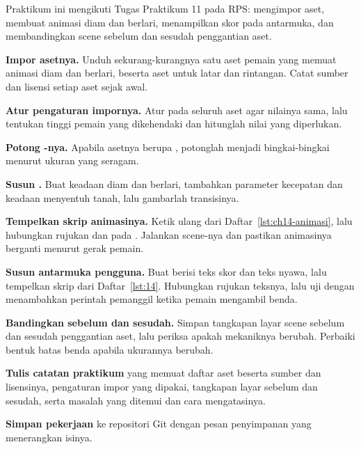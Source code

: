 \begin{praktikumbox}
Praktikum ini mengikuti Tugas Praktikum 11 pada RPS: mengimpor aset, membuat
animasi diam dan berlari, menampilkan skor pada antarmuka, dan membandingkan
scene sebelum dan sesudah penggantian aset.

\begin{langkah}
  \item \textbf{Impor asetnya.} Unduh sekurang-kurangnya satu aset pemain yang
        memuat animasi diam dan berlari, beserta aset untuk latar dan
        rintangan. Catat sumber dan lisensi setiap aset sejak awal.

  \item \textbf{Atur pengaturan impornya.} Atur  pada
        seluruh aset agar nilainya sama, lalu tentukan tinggi pemain yang
        dikehendaki dan hitunglah nilai yang diperlukan.

  \item \textbf{Potong -nya.} Apabila asetnya berupa
        , potonglah menjadi bingkai-bingkai menurut ukuran
        yang seragam.

  \item \textbf{Susun .} Buat keadaan diam dan berlari,
        tambahkan parameter kecepatan dan keadaan menyentuh tanah, lalu
        gambarlah transisinya.

  \item \textbf{Tempelkan skrip animasinya.} Ketik ulang
         dari Daftar~\ref{lst:ch14-animasi}, lalu
        hubungkan rujukan  dan  pada
        . Jalankan scene-nya dan pastikan animasinya
        berganti menurut gerak pemain.

  \item \textbf{Susun antarmuka pengguna.} Buat  berisi teks
        skor dan teks nyawa, lalu tempelkan skrip
         dari Daftar~\ref{lst:14}. Hubungkan
        rujukan teksnya, lalu uji dengan menambahkan perintah pemanggil
         ketika pemain mengambil benda.

  \item \textbf{Bandingkan sebelum dan sesudah.} Simpan tangkapan layar scene
        sebelum dan sesudah penggantian aset, lalu periksa apakah mekaniknya
        berubah. Perbaiki bentuk batas benda apabila ukurannya berubah.

  \item \textbf{Tulis catatan praktikum} yang memuat daftar aset beserta
        sumber dan lisensinya, pengaturan impor yang dipakai, tangkapan layar
        sebelum dan sesudah, serta masalah yang ditemui dan cara
        mengatasinya.

  \item \textbf{Simpan pekerjaan} ke repositori Git dengan pesan penyimpanan
        yang menerangkan isinya.
\end{langkah}
\end{praktikumbox}

